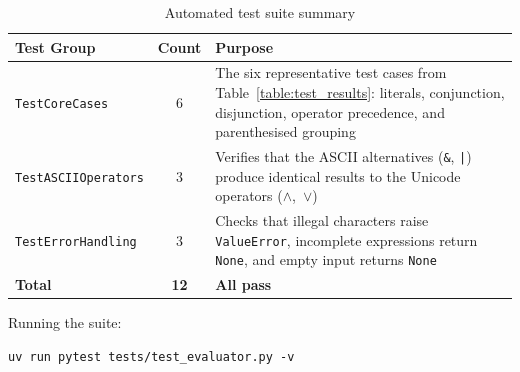 \begin{table}[H]
\centering
\caption{Automated test suite summary}
\label{table:test_suite}
\begin{tabular}{@{}lcp{6.5cm}@{}}
\toprule
Test Group & Count & Purpose \\
\midrule
\texttt{TestCoreCases}       & 6 & The six representative test cases from Table~\ref{table:test_results}: literals, conjunction, disjunction, operator precedence, and parenthesised grouping \\
\texttt{TestASCIIOperators}  & 3 & Verifies that the ASCII alternatives (\texttt{\&}, \texttt{|}) produce identical results to the Unicode operators ($\wedge$,~$\vee$) \\
\texttt{TestErrorHandling}   & 3 & Checks that illegal characters raise \texttt{ValueError}, incomplete expressions return \texttt{None}, and empty input returns \texttt{None} \\
\midrule
\textbf{Total}               & \textbf{12} & \textbf{All pass} \\
\bottomrule
\end{tabular}
\end{table}

Running the suite:
\begin{verbatim}
uv run pytest tests/test_evaluator.py -v
\end{verbatim}
